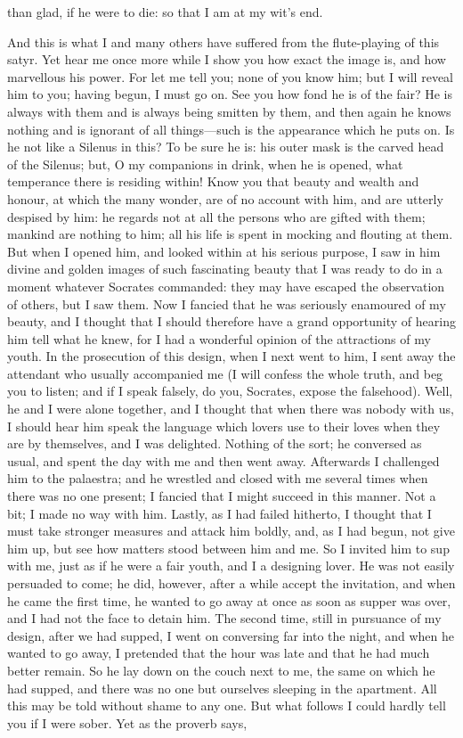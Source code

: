 \documentclass[11pt,letter]{article}
\begin{document}
than glad, if he were to die: so that I am at my wit's end.

\par  And this is what I and many others have suffered from the flute-playing of this satyr. Yet hear me once more while I show you how exact the image is, and how marvellous his power. For let me tell you; none of you know him; but I will reveal him to you; having begun, I must go on. See you how fond he is of the fair? He is always with them and is always being smitten by them, and then again he knows nothing and is ignorant of all things—such is the appearance which he puts on. Is he not like a Silenus in this? To be sure he is: his outer mask is the carved head of the Silenus; but, O my companions in drink, when he is opened, what temperance there is residing within! Know you that beauty and wealth and honour, at which the many wonder, are of no account with him, and are utterly despised by him: he regards not at all the persons who are gifted with them; mankind are nothing to him; all his life is spent in mocking and flouting at them. But when I opened him, and looked within at his serious purpose, I saw in him divine and golden images of such fascinating beauty that I was ready to do in a moment whatever Socrates commanded: they may have escaped the observation of others, but I saw them. Now I fancied that he was seriously enamoured of my beauty, and I thought that I should therefore have a grand opportunity of hearing him tell what he knew, for I had a wonderful opinion of the attractions of my youth. In the prosecution of this design, when I next went to him, I sent away the attendant who usually accompanied me (I will confess the whole truth, and beg you to listen; and if I speak falsely, do you, Socrates, expose the falsehood). Well, he and I were alone together, and I thought that when there was nobody with us, I should hear him speak the language which lovers use to their loves when they are by themselves, and I was delighted. Nothing of the sort; he conversed as usual, and spent the day with me and then went away. Afterwards I challenged him to the palaestra; and he wrestled and closed with me several times when there was no one present; I fancied that I might succeed in this manner. Not a bit; I made no way with him. Lastly, as I had failed hitherto, I thought that I must take stronger measures and attack him boldly, and, as I had begun, not give him up, but see how matters stood between him and me. So I invited him to sup with me, just as if he were a fair youth, and I a designing lover. He was not easily persuaded to come; he did, however, after a while accept the invitation, and when he came the first time, he wanted to go away at once as soon as supper was over, and I had not the face to detain him. The second time, still in pursuance of my design, after we had supped, I went on conversing far into the night, and when he wanted to go away, I pretended that the hour was late and that he had much better remain. So he lay down on the couch next to me, the same on which he had supped, and there was no one but ourselves sleeping in the apartment. All this may be told without shame to any one. But what follows I could hardly tell you if I were sober. Yet as the proverb says, 
\end{document}
